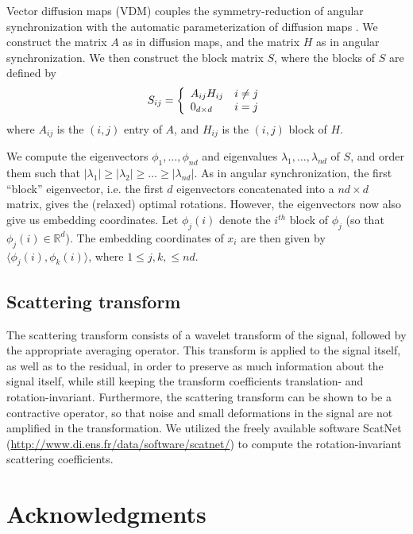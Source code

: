 \documentclass[10pt]{article}
\begin{document}
Vector diffusion maps (VDM) couples the symmetry-reduction of angular synchronization with the automatic parameterization of diffusion maps \cite{singer2012vector}. 
%
We construct the matrix $A$ as in diffusion maps, and the matrix $H$ as in angular synchronization.
%
We then construct the block matrix $S$, where the blocks of $S$ are defined by
\begin{equation}
S_{ij} = \left\{ \begin{array}{l l} 
A_{ij} H_{ij} & i \ne j \\
0_{d \times d} & i = j
\end{array}
\right.
\end{equation}
%
where $A_{ij}$ is the $(i,j)$ entry of $A$, and $H_{ij}$ is the $(i,j)$ block of $H$. 

We compute the eigenvectors $\phi_1, \dots, \phi_{nd}$ and eigenvalues $\lambda_1, \dots, \lambda_{nd}$ of $S$, and order them such that $|\lambda_1| \ge |\lambda_2| \ge \dots \ge |\lambda_{nd}|$.
%
As in angular synchronization, the first ``block'' eigenvector, i.e. the first $d$ eigenvectors concatenated into a $nd \times d$ matrix, gives the (relaxed) optimal rotations. 
%
However, the eigenvectors now also give us embedding coordinates.
%
Let $\phi_j(i)$ denote the $i^{th}$ block of $\phi_j$ (so that $\phi_j(i) \in \mathbb{R}^d$). 
%
The embedding coordinates of $x_i$ are then given by $\langle \phi_j(i), \phi_k(i) \rangle$, where $1 \le j, k, \le nd$. 

\subsection*{Scattering transform}

The scattering transform consists of a wavelet transform of the signal, followed by  the appropriate averaging operator.
%
This transform is applied to the signal itself, as well as to the residual, in order to preserve as much information about the signal itself, while still keeping the transform coefficients translation- and rotation-invariant. 
% 
Furthermore, the scattering transform can be shown to be a contractive operator, so that noise and small deformations in the signal are not amplified in the transformation.
%
We utilized the freely available software ScatNet (\url{http://www.di.ens.fr/data/software/scatnet/}) to compute the rotation-invariant scattering coefficients. 

\section*{Acknowledgments}
\end{document}
